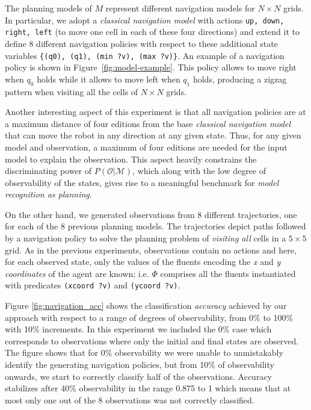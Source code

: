 \documentclass[letterpaper]{article} %
\begin{document}
The planning models of $M$ represent different navigation models for $N\times N$ grids. In particular, we adopt a {\em classical navigation model} with actions {\tt\small up, down, right, left} (to move one cell in each of these four directions) and extend it to define 8 different navigation policies with respect to these additional state variables {\tt\small \{(q0), (q1), (min ?v), (max ?v)\}}. An example of a navigation policy is shown in Figure~\ref{fig:model-example}. This policy allows to move right when $q_0$ holds while it allows to move left when $q_1$ holds, producing a zigzag pattern when visiting all the cells of $N\times N$ grids.

Another interesting aspect of this experiment is that all navigation policies are at a maximum distance of four editions from the base {\em classical navigation model} that can move the robot in any direction at any given state. Thus, for any given model and observation, a maximum of four editions are needed for the input model to explain the observation. This aspect heavily constrains the discriminating power of $P(\mathcal{O}|\mathcal{M})$, which along with the low degree of observability of the states, gives rise to a meaningful benchmark for {\em model recognition as planning}.

On the other hand, we generated observations from 8 different trajectories, one for each of the 8 previous planning models. The trajectories depict paths followed by a navigation policy to solve the planning problem of {\em visiting all} cells in a $5\times 5$ grid. As in the previous experiments, observations contain no actions and here, for each observed state, only the values of the fluents encoding the {\em x} and {\em y coordinates} of the agent are known; i.e. $\Phi$ comprises all the fluents instantiated with predicates {\tt\small (xcoord ?v)} and {\tt\small (ycoord ?v)}.


Figure \ref{fig:navigation_acc} shows the classification {\em accuracy} achieved by our approach with respect to a range of degrees of observability, from 0\% to 100\% with 10\% increments. In this experiment we included the 0\% case which corresponds to observations where only the initial and final states are observed. The figure shows that for 0\% observability we were unable to unmistakably identify the generating navigation policies, but from 10\% of observability onwards, we start to correctly classify half of the observations. Accuracy stabilizes after 40\% observability in the range 0.875 to 1 which means that at most only one out of the 8 observations was not correctly classified.
\end{document}
